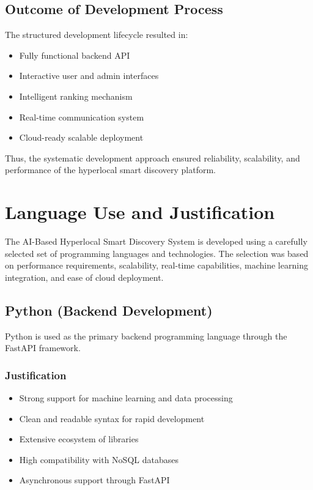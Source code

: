 \documentclass[12pt,a4paper]{report}
\begin{document}
\section{Outcome of Development Process}

The structured development lifecycle resulted in:

\begin{itemize}

\item Fully functional backend API

\item Interactive user and admin interfaces

\item Intelligent ranking mechanism

\item Real-time communication system

\item Cloud-ready scalable deployment

\end{itemize}

Thus, the systematic development approach ensured reliability, scalability, and performance of the hyperlocal smart discovery platform.


\chapter{Language Use and Justification}

The AI-Based Hyperlocal Smart Discovery System is developed using a carefully selected set of programming languages and technologies. The selection was based on performance requirements, scalability, real-time capabilities, machine learning integration, and ease of cloud deployment.

\section{Python (Backend Development)}

Python is used as the primary backend programming language through the FastAPI framework.

\subsection*{Justification}

\begin{itemize}

\item Strong support for machine learning and data processing

\item Clean and readable syntax for rapid development

\item Extensive ecosystem of libraries

\item High compatibility with NoSQL databases

\item Asynchronous support through FastAPI

\end{itemize}
\end{document}
